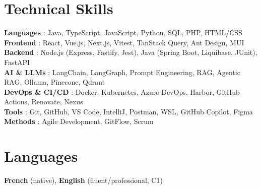 \documentclass[letterpaper,11pt]{article}
\begin{document}
\section{Technical Skills}
    \begin{itemize}[leftmargin=0.15in, label={}]
        \small{\item{
            \textbf{Languages} : Java, TypeScript, JavaScript, Python, SQL, PHP, HTML/CSS \\
            \textbf{Frontend} : React, Vue.js, Next.js, Vitest, TanStack Query, Ant Design, MUI \\
            \textbf{Backend} : Node.js (Express, Fastify, Jest), Java (Spring Boot, Liquibase, JUnit), FastAPI \\
            \textbf{AI \& LLMs} : LangChain, LangGraph, Prompt Engineering, RAG, Agentic RAG, Ollama, Pinecone, Qdrant \\
            \textbf{DevOps \& CI/CD} : Docker, Kubernetes, Azure DevOps, Harbor, GitHub Actions, Renovate, Nexus \\
            \textbf{Tools} : Git, GitHub, VS Code, IntelliJ, Postman, WSL, GitHub Copilot, Figma \\
            \textbf{Methods} : Agile Development, GitFlow, Scrum
        }}
    \end{itemize}

\section{Languages}
    \textbf{French} (native), \textbf{English} (fluent/professional, C1)

\end{document}
